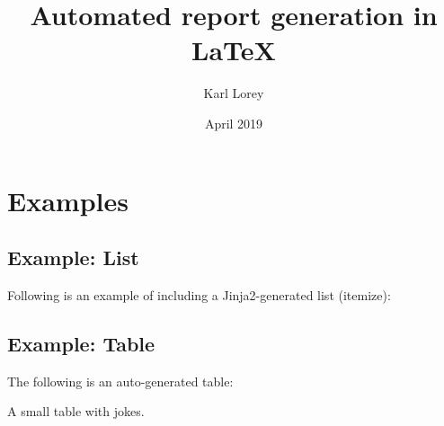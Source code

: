 \documentclass[11pt,a4paper]{report}
\begin{document}
\title{Automated report generation in LaTeX}
\author{Karl Lorey}
\date{April 2019}
\maketitle

\chapter{Examples}

\section{Example: List}
Following is an example of including a Jinja2-generated list (itemize):


\section{Example: Table}
The following is an auto-generated table:
\begin{table}[h]
\centering
{\small

}
\caption{A small table with jokes.}
\end{table}
\end{document}
